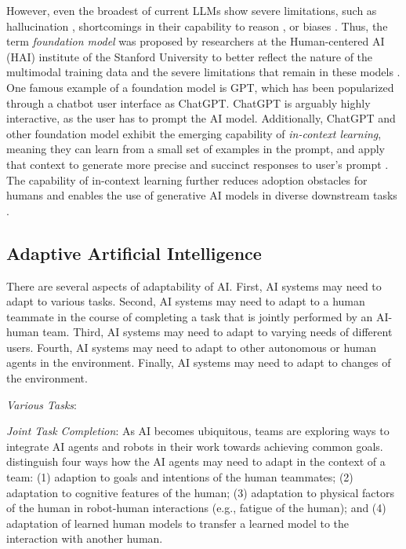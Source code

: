However, even the broadest of current LLMs show severe limitations, such
as hallucination \citep{jiSurveyHallucinationNatural2023}, shortcomings in their capability to reason 
\citep{bangMultitaskMultilingualMultimodal2023}, or biases \citep{tamkinUnderstandingCapabilitiesLimitations2021}.
Thus, the term \textit{foundation model} was proposed by researchers at the Human-centered AI (HAI) institute of the
Stanford University to better reflect the nature of the multimodal training data and the severe limitations that remain
in these models \citep{bommasaniOpportunitiesRisksFoundation2022}. One famous example of a foundation model is GPT, which
has been popularized through a chatbot user interface as ChatGPT. ChatGPT is arguably highly interactive, as the user has
to prompt the AI model. Additionally, ChatGPT and other
foundation model exhibit the emerging capability of \textit{in-context learning}, meaning they can learn from a
small set of examples in the prompt, and apply that context to generate more precise and succinct responses to
user's prompt \citep{bommasaniOpportunitiesRisksFoundation2022}. The capability of in-context learning further
reduces adoption obstacles for humans and enables the use of generative AI models in diverse downstream tasks
\citep{bommasaniOpportunitiesRisksFoundation2022}.

\subsection{Adaptive Artificial Intelligence}

There are several aspects of adaptability of AI. First, AI systems may need to adapt to various tasks. Second,
AI systems may need to adapt to a human teammate in the course of completing a task that is jointly performed by
an AI-human team. Third, AI systems may need to adapt to varying needs of different users. Fourth, AI systems
may need to adapt to other autonomous or human agents in the environment. Finally, AI systems may need to adapt
to changes of the environment.

\textit{Various Tasks}: 

\textit{Joint Task Completion}:
As AI becomes ubiquitous, teams are exploring ways to integrate AI agents and robots in their work towards
achieving common goals. \cite{zhaoRoleAdaptationCollective2022} distinguish four ways how the AI agents may need
to adapt in the context of a team: (1) adaption to goals and intentions of the human teammates; (2) adaptation
to cognitive features of the human; (3) adaptation to physical factors of the human in robot-human interactions
(e.g., fatigue of the human); and (4) adaptation of learned human models to transfer a learned model to the
interaction with another human.

